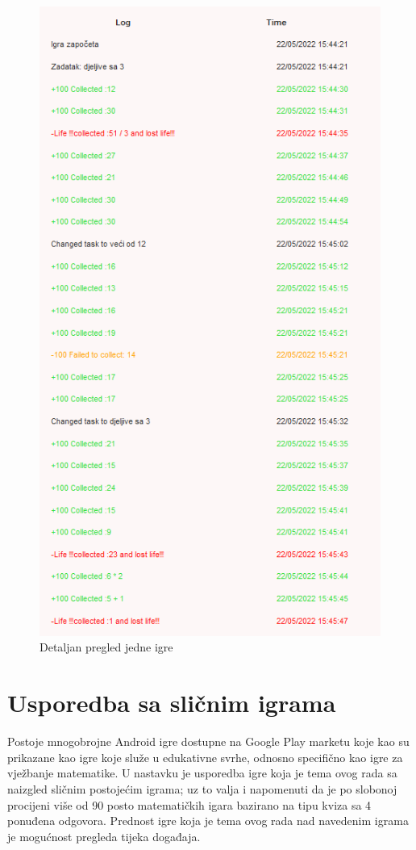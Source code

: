 \documentclass[times, utf8, zavrsni]{fer}
\begin{document}
	\begin{figure}[H]
		\includegraphics[scale = 0.9]{"slike/detaljanpregledrezultata.png"} 
		\centering
		\caption{Detaljan pregled jedne igre}
		\label{fig:pregledjedneigre}
	\end{figure}
	

\chapter{Usporedba sa sličnim igrama}
Postoje mnogobrojne Android igre dostupne na Google Play marketu koje kao su prikazane kao igre koje služe u edukativne svrhe, odnosno specifično kao igre za vježbanje matematike.  U nastavku je usporedba igre koja je tema ovog rada sa naizgled 
sličnim postojećim igrama; uz to valja i napomenuti da je po slobonoj procijeni više od 90 posto matematičkih igara bazirano na tipu kviza sa 4 ponuđena odgovora. Prednost igre koja je tema ovog rada nad navedenim igrama je mogućnost pregleda tijeka događaja.
	
\end{document}

